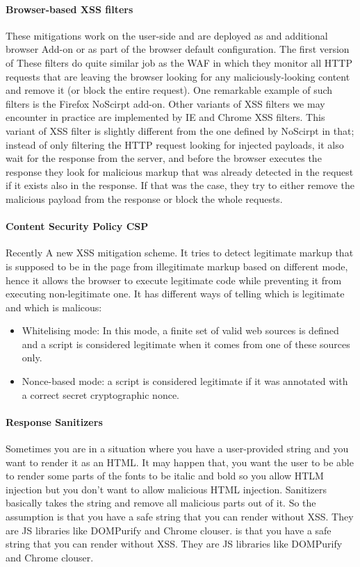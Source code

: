 \paragraph{Browser-based XSS filters} These mitigations work on the user-side and are deployed as and additional browser Add-on or as part of the browser default configuration. The first version of These filters do quite similar job as the WAF in which they monitor all HTTP requests that are leaving the browser looking for any maliciously-looking content and remove it (or block the entire request). One remarkable example of such filters is the Firefox NoScirpt add-on. Other variants of XSS filters we may encounter in practice are implemented by IE and Chrome XSS filters. This variant of XSS filter is slightly different from the one defined by NoScirpt in that; instead of only filtering the HTTP request looking for injected payloads, it also wait for the response from the server, and before the browser executes the response they look for malicious markup that was already detected in the request if it exists also in the response. If that was the case, they try to either remove the malicious payload from the response or block the whole requests.

\paragraph{Content Security Policy CSP} Recently A new XSS mitigation scheme. It tries to detect legitimate markup that is supposed to be in the page from illegitimate markup based on different mode, hence it allows the browser to execute legitimate code while preventing it from executing non-legitimate one. It has different ways of telling which is legitimate and which is malicous: 

\begin{itemize}
	\item Whitelising mode: In this mode, a finite set of valid web sources is defined and a script is considered legitimate when it comes from one of these sources only.
	\item Nonce-based mode: a script is considered legitimate if it was annotated with a correct secret cryptographic nonce.
\end{itemize}

\paragraph{Response Sanitizers} Sometimes you are in a situation where you have a user-provided string and you want to render it as an HTML. It may happen that, you want the user to be able to render some parts of the fonts to be italic and bold so you allow HTLM injection but you don’t want to allow malicious HTML injection. Sanitizers basically takes the string and remove all malicious parts out of it. So the assumption is that you have a safe string that you can render without XSS. They are JS libraries like DOMPurify and Chrome clouser. is that you have a safe string that you can render without XSS. They are JS libraries like DOMPurify and Chrome clouser.

